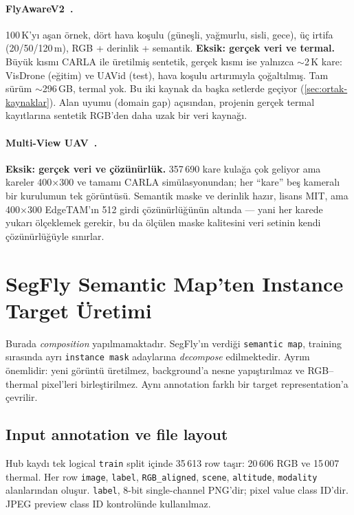 \paragraph{FlyAwareV2~\cite{flyawarev2}.}
100\,K'yı aşan örnek, dört hava koşulu (güneşli, yağmurlu, sisli, gece),
üç irtifa (20/50/120\,m), RGB + derinlik + semantik. \textbf{Eksik: gerçek veri ve termal.}
Büyük kısmı CARLA ile üretilmiş sentetik, gerçek kısmı ise yalnızca
$\sim$2\,K kare: VisDrone (eğitim) ve UAVid (test), hava koşulu
artırımıyla çoğaltılmış. Tam sürüm $\sim$296\,GB, termal yok. Bu iki
kaynak da başka setlerde geçiyor (\cref{sec:ortak-kaynaklar}).
Alan uyumu (domain gap) açısından, projenin gerçek termal kayıtlarına
sentetik RGB'den daha uzak bir veri kaynağı.

\paragraph{Multi-View UAV~\cite{multiviewuav2025}.}
\textbf{Eksik: gerçek veri ve çözünürlük.} 357\,690 kare kulağa çok
geliyor ama kareler 400×300 ve tamamı CARLA simülasyonundan; her ``kare'' beş kameralı bir kurulumun tek görüntüsü.
Semantik maske ve derinlik hazır, lisans MIT, ama 400×300 EdgeTAM'ın
512 girdi çözünürlüğünün altında --- yani her karede yukarı ölçeklemek
gerekir, bu da ölçülen maske kalitesini veri setinin kendi
çözünürlüğüyle sınırlar.

\section{SegFly Semantic Map'ten Instance Target Üretimi}
\label{sec:segfly-instance}

Burada \emph{composition} yapılmamaktadır. SegFly'ın verdiği
\texttt{semantic map}, training sırasında ayrı \texttt{instance mask}
adaylarına \emph{decompose} edilmektedir. Ayrım önemlidir: yeni görüntü
üretilmez, background'a nesne yapıştırılmaz ve RGB--thermal pixel'leri
birleştirilmez. Aynı annotation farklı bir target representation'a
çevrilir.

\subsection{Input annotation ve file layout}

Hub kaydı tek logical \texttt{train} split içinde 35\,613 row taşır:
20\,606 RGB ve 15\,007 thermal. Her row
\texttt{image}, \texttt{label}, \texttt{RGB\_aligned},
\texttt{scene}, \texttt{altitude}, \texttt{modality} alanlarından
oluşur. \texttt{label}, 8-bit single-channel PNG'dir; pixel value class
ID'dir. JPEG preview class ID kontrolünde kullanılmaz.


